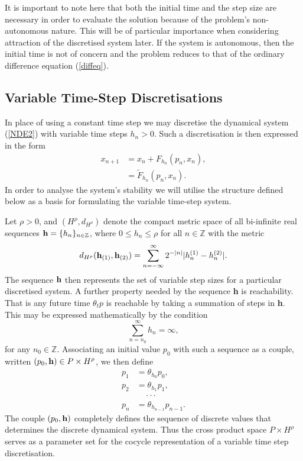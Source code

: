 It is important to note here that both the initial time and the
step size are necessary in order to evaluate the solution because
of the problem's non-autonomous nature. This will be of particular
importance when considering attraction of the discretised system
later. If the system is autonomous, then the initial time is not
of concern and the problem reduces to that of the ordinary
difference equation (\ref{diffeq}).

\subsection{Variable Time-Step Discretisations} \label{vtssec}

In place of using a constant time step we may discretise the dynamical
system (\ref{NDE2}) with variable time steps $h_n > 0$. Such a
discretisation is then expressed in the form
\begin{align}\label{vtsnumeq}
   x_{n+1} &= x_n + F_{h_n}(p_n, x_n), \\
   &= \tilde{F}_{h_n}(p_n, x_n).
\end{align}
In order to analyse the system's stability we will utilise
the structure defined below as a basis for formulating the variable time-step
system.

Let $\rho > 0$, and $(H^{\rho},
d_{H^{\rho}})$ denote the compact metric space of all bi-infinite real
sequences ${\bf h} = \{h_n\}_{n \in \mathbb{Z}}$, where $0
\leq h_n \leq \rho$ for all $n \in \mathbb{Z}$ with the metric
\[ d_{H^{\rho}} ({\bf h}_{(1)}, {\bf h}_{(2)}) = \sum_{n = -
                \infty}^{\infty} 2^{-|n|}|h_n^{(1)} - h_n^{(2)}|. \]
The sequence ${\bf h}$ then represents the set of variable step sizes for a
particular discretised system. A further property needed by the sequence {\bf
h} is reachability. That is any future time $\theta_tp$ is reachable by taking
a summation of steps in {\bf h}.  This may be expressed mathematically by
the condition
\[ \sum_{n=n_0}^{\infty} h_n = \infty, \]
for any $n_0 \in \mathbb{Z}$. Associating an initial value $p_0$ with such a
sequence as a couple, written $(p_0, {\bf h}) \in P \times H^{\rho}$, we then
define
\begin{align*}
  p_1 &= \theta_{h_0}p_0, \\
  p_2 &= \theta_{h_1}p_1, \\
  & \quad \cdot \cdot \cdot \\
  p_n &= \theta_{h_{n-1}}p_{n-1}.
\end{align*}
The couple $(p_0, {\bf h})$ completely defines the sequence of
discrete values that determines the discrete dynamical system.
Thus the cross product space $P \times H^{\rho}$ serves as a parameter set
for the cocycle representation of a variable time step discretisation.


